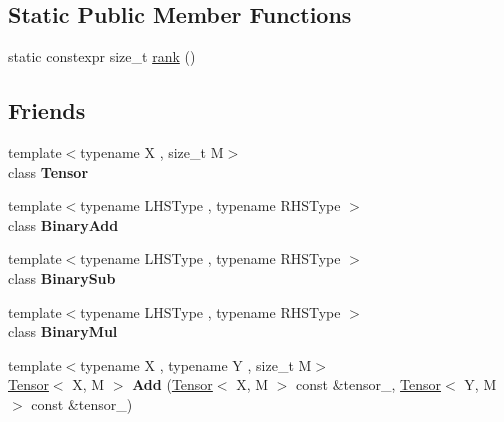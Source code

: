 \subsection*{Static Public Member Functions}
\begin{DoxyCompactItemize}
\item 
static constexpr size\+\_\+t \hyperlink{classtensor_1_1Tensor_af8cf6037659bed7a53c92888b51a34fb}{rank} ()
\end{DoxyCompactItemize}
\subsection*{Friends}
\begin{DoxyCompactItemize}
\item 
{\footnotesize template$<$typename X , size\+\_\+t M$>$ }\\class {\bfseries Tensor}\hypertarget{classtensor_1_1Tensor_af4a07134de1525172d3c60c57e8f1496}{}\label{classtensor_1_1Tensor_af4a07134de1525172d3c60c57e8f1496}

\item 
{\footnotesize template$<$typename L\+H\+S\+Type , typename R\+H\+S\+Type $>$ }\\class {\bfseries Binary\+Add}\hypertarget{classtensor_1_1Tensor_a4d665549d16efb911a856dc6fd122618}{}\label{classtensor_1_1Tensor_a4d665549d16efb911a856dc6fd122618}

\item 
{\footnotesize template$<$typename L\+H\+S\+Type , typename R\+H\+S\+Type $>$ }\\class {\bfseries Binary\+Sub}\hypertarget{classtensor_1_1Tensor_afc63fe61d41c24c197bbf470274e78c5}{}\label{classtensor_1_1Tensor_afc63fe61d41c24c197bbf470274e78c5}

\item 
{\footnotesize template$<$typename L\+H\+S\+Type , typename R\+H\+S\+Type $>$ }\\class {\bfseries Binary\+Mul}\hypertarget{classtensor_1_1Tensor_a4e70ecf474c03f7e2051b75bb9af6110}{}\label{classtensor_1_1Tensor_a4e70ecf474c03f7e2051b75bb9af6110}

\item 
{\footnotesize template$<$typename X , typename Y , size\+\_\+t M$>$ }\\\hyperlink{classtensor_1_1Tensor}{Tensor}$<$ X, M $>$ {\bfseries Add} (\hyperlink{classtensor_1_1Tensor}{Tensor}$<$ X, M $>$ const \&tensor\+\_, \hyperlink{classtensor_1_1Tensor}{Tensor}$<$ Y, M $>$ const \&tensor\+\_)\hypertarget{classtensor_1_1Tensor_aa09bbe30c06ac53c4736151a98423eab}{}\label{classtensor_1_1Tensor_aa09bbe30c06ac53c4736151a98423eab}


\end{DoxyCompactItemize}
